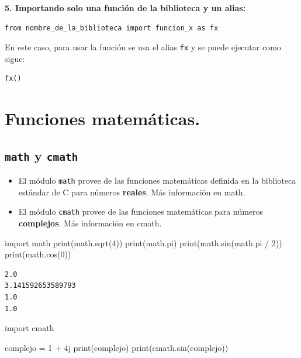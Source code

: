 \documentclass[
  spanish,
  letterpaper,
]{scrbook}
\newenvironment{Shaded}{\begin{snugshade}}{\end{snugshade}}
\newcommand{\BuiltInTok}[1]{\textcolor[rgb]{0.00,0.23,0.31}{#1}}
\newcommand{\DecValTok}[1]{\textcolor[rgb]{0.68,0.00,0.00}{#1}}
\newcommand{\ImportTok}[1]{\textcolor[rgb]{0.00,0.46,0.62}{#1}}
\newcommand{\NormalTok}[1]{\textcolor[rgb]{0.00,0.23,0.31}{#1}}
\newcommand{\OperatorTok}[1]{\textcolor[rgb]{0.37,0.37,0.37}{#1}}
\newcommand{\OtherTok}[1]{\textcolor[rgb]{0.00,0.23,0.31}{#1}}
\theoremstyle{definition}
\theoremstyle{remark}
\begin{document}
\textbf{5. Importando solo una función de la biblioteca y un alias:}

\begin{verbatim}
from nombre_de_la_biblioteca import funcion_x as fx
\end{verbatim}

En este caso, para usar la función se usa el alias \texttt{fx} y se
puede ejecutar como sigue:

\begin{verbatim}
fx()
\end{verbatim}

\section{Funciones matemáticas.}\label{sec-funciones_math}

\subsection{\texorpdfstring{\texttt{math} y
\texttt{cmath}}{math y cmath}}\label{math-y-cmath}

\begin{itemize}
\item
  El módulo \texttt{math} provee de las funciones matemáticas definida
  en la biblioteca estándar de C para números \textbf{reales}. Más
  información en math.
\item
  El módulo \texttt{cmath} provee de las funciones matemáticas para
  números \textbf{complejos}. Más información en cmath.
\end{itemize}

\begin{Shaded}
\begin{Highlighting}[]
\ImportTok{import}\NormalTok{ math}
\BuiltInTok{print}\NormalTok{(math.sqrt(}\DecValTok{4}\NormalTok{))}
\BuiltInTok{print}\NormalTok{(math.pi)}
\BuiltInTok{print}\NormalTok{(math.sin(math.pi }\OperatorTok{/} \DecValTok{2}\NormalTok{))}
\BuiltInTok{print}\NormalTok{(math.cos(}\DecValTok{0}\NormalTok{))}
\end{Highlighting}
\end{Shaded}

\begin{verbatim}
2.0
3.141592653589793
1.0
1.0
\end{verbatim}

\begin{Shaded}
\begin{Highlighting}[]
\ImportTok{import}\NormalTok{ cmath}

\NormalTok{complejo }\OperatorTok{=} \DecValTok{1} \OperatorTok{+} \OtherTok{4j}
\BuiltInTok{print}\NormalTok{(complejo)}
\BuiltInTok{print}\NormalTok{(cmath.sin(complejo))}
\end{Highlighting}
\end{Shaded}
\end{document}
